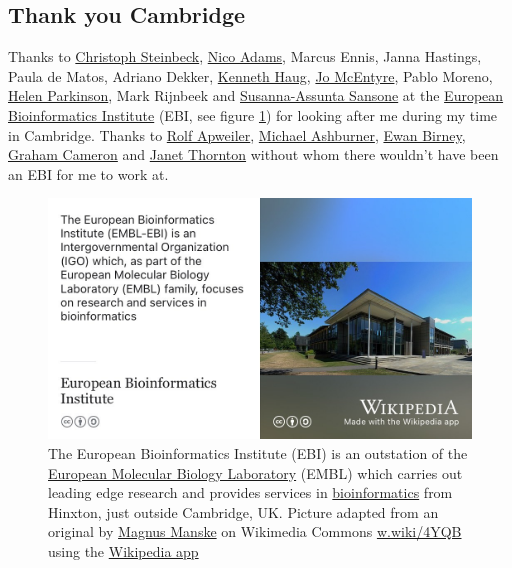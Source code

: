 \documentclass[
]{book}
\begin{document}
\hypertarget{cambridge}{%
\subsection{Thank you Cambridge}\label{cambridge}}

Thanks to \href{https://en.wikipedia.org/wiki/Christoph_Steinbeck}{Christoph Steinbeck}, \href{https://scholar.google.com/citations?user=3-PcEsEAAAAJ}{Nico Adams}, Marcus Ennis, Janna Hastings, Paula de Matos, Adriano Dekker, \href{https://twitter.com/kennethhaug}{Kenneth Haug}, \href{https://twitter.com/jomcentyre}{Jo McEntyre}, Pablo Moreno, \href{https://twitter.com/drp_stuff}{Helen Parkinson}, Mark Rijnbeek and \href{https://en.wikipedia.org/wiki/Susanna-Assunta_Sansone}{Susanna-Assunta Sansone} at the \href{https://en.wikipedia.org/wiki/European_Bioinformatics_Institute}{European Bioinformatics Institute} (EBI, see figure \ref{fig:cambridge-fig}) for looking after me during my time in Cambridge. Thanks to \href{https://en.wikipedia.org/wiki/Rolf_Apweiler}{Rolf Apweiler}, \href{https://en.wikipedia.org/wiki/Michael_Ashburner}{Michael Ashburner}, \href{https://en.wikipedia.org/wiki/Ewan_Birney}{Ewan Birney}, \href{https://www.ebi.ac.uk/about/news/announcements/25-anniversary-embl-ebi/}{Graham Cameron} and \href{https://en.wikipedia.org/wiki/Janet_Thornton}{Janet Thornton} without whom there wouldn't have been an EBI for me to work at.

\begin{figure}

{\centering \includegraphics[width=1\linewidth]{images/european-bioinformatics-institute} 

}

\caption{The European Bioinformatics Institute (EBI) is an outstation of the \href{https://en.wikipedia.org/wiki/European_Molecular_Biology_Laboratory}{European Molecular Biology Laboratory} (EMBL) which carries out leading edge research and provides services in \href{https://en.wikipedia.org/wiki/Bioinformatics}{bioinformatics} from Hinxton, just outside Cambridge, UK. Picture adapted from an original by \href{https://en.wikipedia.org/wiki/Magnus_Manske}{Magnus Manske} on Wikimedia Commons \href{https://w.wiki/4YQB}{w.wiki/4YQB} using the \href{https://apps.apple.com/us/app/wikipedia/id324715238}{Wikipedia app}}\label{fig:cambridge-fig}
\end{figure}
\end{document}
